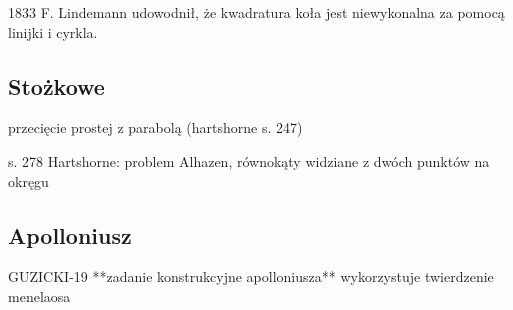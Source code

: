 1833 F. Lindemann udowodnił, że kwadratura koła jest niewykonalna za pomocą linijki i cyrkla.

\subsection{Stożkowe}
przecięcie prostej z parabolą (hartshorne s. 247)

s. 278 Hartshorne: problem Alhazen, równokąty widziane z dwóch punktów na okręgu

\subsection{Apolloniusz}
GUZICKI-19 **zadanie konstrukcyjne apolloniusza** wykorzystuje twierdzenie menelaosa










%


